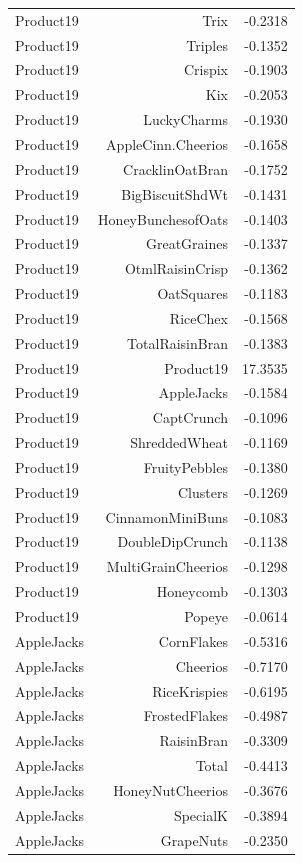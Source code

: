 \begin{longtable}{@{}lrr@{}}
Product19 & Trix & -0.2318 \\
Product19 & Triples & -0.1352 \\
Product19 & Crispix & -0.1903 \\
Product19 & Kix & -0.2053 \\
Product19 & LuckyCharms & -0.1930 \\
Product19 & AppleCinn.Cheerios & -0.1658 \\
Product19 & CracklinOatBran & -0.1752 \\
Product19 & BigBiscuitShdWt & -0.1431 \\
Product19 & HoneyBunchesofOats & -0.1403 \\
Product19 & GreatGraines & -0.1337 \\
Product19 & OtmlRaisinCrisp & -0.1362 \\
Product19 & OatSquares & -0.1183 \\
Product19 & RiceChex & -0.1568 \\
Product19 & TotalRaisinBran & -0.1383 \\
Product19 & Product19 & 17.3535 \\
Product19 & AppleJacks & -0.1584 \\
Product19 & CaptCrunch & -0.1096 \\
Product19 & ShreddedWheat & -0.1169 \\
Product19 & FruityPebbles & -0.1380 \\
Product19 & Clusters & -0.1269 \\
Product19 & CinnamonMiniBuns & -0.1083 \\
Product19 & DoubleDipCrunch & -0.1138 \\
Product19 & MultiGrainCheerios & -0.1298 \\
Product19 & Honeycomb & -0.1303 \\
Product19 & Popeye & -0.0614 \\
AppleJacks & CornFlakes & -0.5316 \\
AppleJacks & Cheerios & -0.7170 \\
AppleJacks & RiceKrispies & -0.6195 \\
AppleJacks & FrostedFlakes & -0.4987 \\
AppleJacks & RaisinBran & -0.3309 \\
AppleJacks & Total & -0.4413 \\
AppleJacks & HoneyNutCheerios & -0.3676 \\
AppleJacks & SpecialK & -0.3894 \\
AppleJacks & GrapeNuts & -0.2350 \\

\end{longtable}
